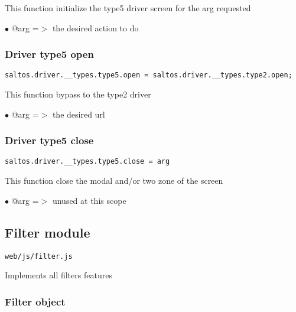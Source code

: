 \documentclass[a4paper]{article}
\begin{document}
This function initialize the type5 driver screen for the arg requested

\begin{compactitem}
\item[\color{myblue}$\bullet$] @arg =$>$ the desired action to do
\end{compactitem}

\hypertarget{toc762}{}
\subsubsection{Driver type5 open}

\begin{lstlisting}
saltos.driver.__types.type5.open = saltos.driver.__types.type2.open;
\end{lstlisting}

This function bypass to the type2 driver

\begin{compactitem}
\item[\color{myblue}$\bullet$] @arg =$>$ the desired url
\end{compactitem}

\hypertarget{toc763}{}
\subsubsection{Driver type5 close}

\begin{lstlisting}
saltos.driver.__types.type5.close = arg
\end{lstlisting}

This function close the modal and/or two zone of the screen

\begin{compactitem}
\item[\color{myblue}$\bullet$] @arg =$>$ unused at this scope
\end{compactitem}

\hypertarget{toc764}{}
\subsection{Filter module}

\begin{lstlisting}
web/js/filter.js
\end{lstlisting}

Implements all filters features

\hypertarget{toc765}{}
\subsubsection{Filter object}
\end{document}

